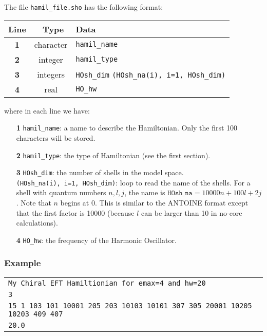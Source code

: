 \documentclass[a4paper,11pt]{article}
\renewcommand{\tt}[1]{\texttt{#1}}
\begin{document}
The file \tt{hamil\_file.sho} has the following format: 
\begin{center}
\begin{tabular}{|c|c|l|}
\hline
Line & \ Type \hfill & Data \\
\hline
 \textbf{1}   & character  & \tt{hamil\_name} \\
 \textbf{2}   & integer    & \tt{hamil\_type} \\
 \textbf{3}   & integers   & \tt{HOsh\_dim}  \: \tt{(HOsh\_na(i), i=1, HOsh\_dim)} \\
 \textbf{4}   & real       & \tt{HO\_hw} \\
\hline
\end{tabular}
\end{center}
where in each line we have:
\begin{itemize}
\item[\textbf{1}] \tt{hamil\_name}: a name to describe the Hamiltonian. Only the first 100 characters will be stored.
\item[\textbf{2}] \tt{hamil\_type}: the type of Hamiltonian (see the first section). 
\item[\textbf{3}] \tt{HOsh\_dim}: the number of shells in the  model space. \\
                  \tt{(HOsh\_na(i), i=1, HOsh\_dim)}: loop to read the name of the shells. For a shell with quantum numbers $n,l,j$, the
                  name is $\tt{HOsh\_na} = 10000n + 100l + 2j$. Note that $n$ begins at 0. This is similar to the ANTOINE format except
                   that the first factor is 10000 (because $l$ can be larger than 10 in no-core calculations).
\item[\textbf{4}] \tt{HO\_hw}: the frequency of the Harmonic Oscillator.
\end{itemize}

\subsubsection*{Example}
\begin{center}
\begin{tabular}{|l|}
\hline
  \tt{My Chiral EFT Hamiltionian for emax=4 and hw=20} \\
  \tt{3} \\
  \tt{15      1    103    101  10001    205    203  10103  10101    307    305  20001  10205  10203    409    407} \\
  \tt{20.0} \\
\hline
\end{tabular}
\end{center}
\end{document}
